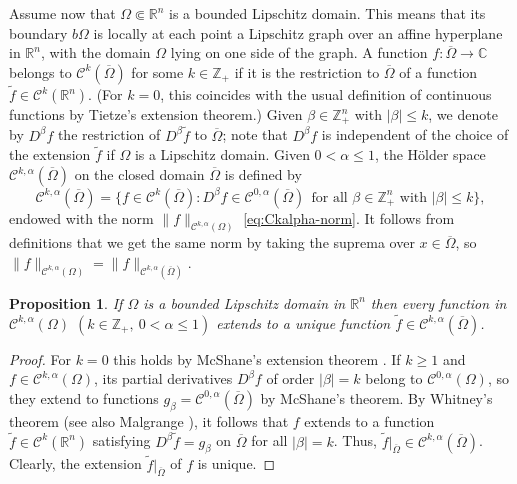 \documentclass[11pt]{amsart}
\numberwithin{equation}{section}
\newtheorem{proposition}[theorem]{Proposition}
\theoremstyle{definition}
\newcommand\Cscr{\mathscr{C}}
\newcommand\C{\mathbb{C}}
\newcommand\R{\mathbb{R}}
\newcommand\Z{\mathbb{Z}}
\begin{document}
Assume now that $\Omega\Subset \R^n$ is a bounded 
Lipschitz domain. This means that its boundary $b\Omega$
is locally at each point a Lipschitz graph over an 
affine hyperplane in $\R^n$, with the domain $\Omega$ lying on one side
of the graph. A function $f:\overline \Omega\to\C$ 
belongs to $\Cscr^k(\overline \Omega)$ for some $k\in\Z_+$ if it 
is the restriction to $\overline \Omega$ of a function 
$\tilde f\in \Cscr^k(\R^n)$. (For $k=0$, this coincides with the usual
definition of continuous functions by Tietze's extension theorem.) 
Given $\beta\in \Z_+^n$ with $|\beta|\le k$, we denote by 
$D^\beta f$ the restriction of $D^\beta \tilde f$ to $\overline \Omega$;
note that $D^\beta f$ is independent of the choice of the extension $\tilde f$
if $\Omega$ is a Lipschitz domain. 
Given $0<\alpha\le 1$, the H\"older space 
$\Cscr^{k,\alpha}(\overline \Omega)$ on the closed domain 
$\overline\Omega$ is defined by
\[
	\Cscr^{k,\alpha}(\overline \Omega)=
	\big\{f\in \Cscr^k(\overline \Omega):
	D^\beta f \in \Cscr^{0,\alpha}(\overline \Omega)\ \ 
	\text{for all $\beta\in \Z_+^n$ with $|\beta|\le k$} \big\},
\]
endowed with the norm $\|f\|_{\Cscr^{k,\alpha}(\Omega)}$ 
\eqref{eq:Ckalpha-norm}. It follows from definitions 
that we get the same norm by taking the suprema over
$x\in \overline\Omega$, so 
$\|f\|_{\Cscr^{k,\alpha}(\Omega)}=\|f\|_{\Cscr^{k,\alpha}(\overline\Omega)}$.

%
%
\begin{proposition}
\label{prop:extension}
If $\Omega$ is a bounded Lipschitz domain in $\R^n$
then every function in $\Cscr^{k,\alpha}(\Omega)$
$(k\in \Z_+,\ 0<\alpha\le 1)$ extends to a unique function  
$\tilde f\in \Cscr^{k,\alpha}(\overline \Omega)$.
\end{proposition}

\begin{proof}
For $k=0$ this holds by McShane's extension theorem  
\cite[Corollary 1, p.\ 840]{McShane1934}. If $k\ge 1$
and $f\in \Cscr^{k,\alpha}(\Omega)$, its partial derivatives
$D^\beta f$ of order $|\beta|=k$ belong to $\Cscr^{0,\alpha}(\Omega)$,
so they extend to functions $g_\beta=\Cscr^{0,\alpha}(\overline \Omega)$
by McShane's theorem. By Whitney's theorem \cite{Whitney1934TAMS}
(see also Malgrange \cite[Theorem 3.2 and Comp.\ 3.5]{Malgrange1966}), 
it follows that $f$ extends to a function $\tilde f\in \Cscr^k(\R^n)$
satisfying $D^\beta \tilde f= g_\beta$ on $\overline \Omega$ for 
all $|\beta|=k$. Thus, 
$\tilde f|_{\overline\Omega}\in \Cscr^{k,\alpha}(\overline\Omega)$.
Clearly, the extension $\tilde f|_{\overline\Omega}$ of $f$ is unique.
\end{proof}
\end{document}
